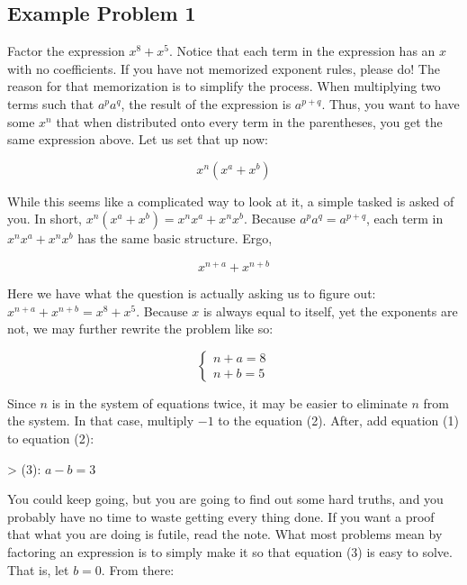 \subsection{Example Problem 1}
\label{sss:exam-cc9e}




Factor the expression $x^8+x^5$. Notice that each term in the expression has an $x$ with
no coefficients. If you have not memorized exponent rules, please do! The reason for that
memorization is to simplify the process. When multiplying two terms such that
$a^{p}a^{q}$, the result of the expression is $a^{p+q}$. Thus, you want to have some
$x^{n}$ that when distributed onto every term in the parentheses, you get the same
expression above. Let us set that up now:



$$x^{n}\left(x^{a}+x^{b}\right)$$



While this seems like a complicated way to look at it, a simple tasked is asked of you. In
short, $x^{n}\left(x^{a}+x^{b}\right)=x^{n}x^{a}+x^{n}x^{b}$. Because
$a^{p}a^{q}=a^{p+q}$, each term in $x^{n}x^{a}+x^{n}x^{b}$ has the same basic structure.
Ergo,



$$x^{n+a}+x^{n+b}$$



Here we have what the question is actually asking us to figure out:
$x^{n+a}+x^{n+b}=x^8+x^5$. Because $x$ is always equal to itself, yet the exponents are
not, we may further rewrite the problem like so:



$$\begin{cases} n+a=8 \\ n+b=5 \end{cases}$$



Since $n$ is in the system of equations twice, it may be easier to eliminate $n$ from the
system. In that case, multiply $-1$ to the equation (2). After, add equation (1) to
equation (2):



> (3): $a-b=3$



You could keep going, but you are going to find out some hard truths, and you probably
have no time to waste getting every thing done. If you want a proof that what you are
doing is futile, read the note. What most problems mean by factoring an
expression is to simply make it so that equation (3) is easy to solve. That is, let $b=0$.
From there:



